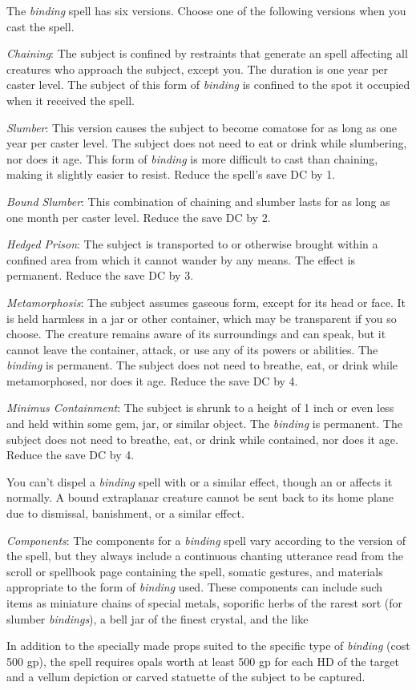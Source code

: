 {	The \emph{binding} spell has six versions. Choose one of the following versions when you cast the spell.

	\textit{Chaining}:
	The subject is confined by restraints that generate an  spell affecting all creatures who approach the subject, except you. The duration is one year per caster level. The subject of this form of \emph{binding} is confined to the spot it occupied when it received the spell.

	\textit{Slumber}:
	This version causes the subject to become comatose for as long as one year per caster level. The subject does not need to eat or drink while slumbering, nor does it age. This form of \emph{binding} is more difficult to cast than chaining, making it slightly easier to resist. Reduce the spell's save DC by 1.

	\textit{Bound Slumber}:
	This combination of chaining and slumber lasts for as long as one month per caster level. Reduce the save DC by 2.

	\textit{Hedged Prison}:
	The subject is transported to or otherwise brought within a confined area from which it cannot wander by any means. The effect is permanent. Reduce the save DC by 3.

	\textit{Metamorphosis}:
	The subject assumes gaseous form, except for its head or face. It is held harmless in a jar or other container, which may be transparent if you so choose. The creature remains aware of its surroundings and can speak, but it cannot leave the container, attack, or use any of its powers or abilities. The \emph{binding} is permanent. The subject does not need to breathe, eat, or drink while metamorphosed, nor does it age. Reduce the save DC by 4.

	\textit{Minimus Containment}:
	The subject is shrunk to a height of 1 inch or even less and held within some gem, jar, or similar object. The \emph{binding} is permanent. The subject does not need to breathe, eat, or drink while contained, nor does it age. Reduce the save DC by 4.

	You can't dispel a \emph{binding} spell with  or a similar effect, though an  or  affects it normally. A bound extraplanar creature cannot be sent back to its home plane due to dismissal, banishment, or a similar effect.

	\textit{Components}:
	The components for a \emph{binding} spell vary according to the version of the spell, but they always include a continuous chanting utterance read from the scroll or spellbook page containing the spell, somatic gestures, and materials appropriate to the form of \emph{binding} used. These components can include such items as miniature chains of special metals, soporific herbs of the rarest sort (for slumber \emph{bindings}), a bell jar of the finest crystal, and the like

	In addition to the specially made props suited to the specific type of \emph{binding} (cost 500 gp), the spell requires opals worth at least 500 gp for each HD of the target and a vellum depiction or carved statuette of the subject to be captured.

}
